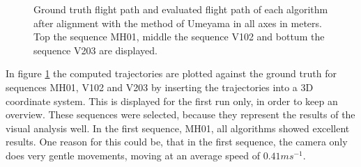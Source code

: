 	\begin{figure}%
    \centering
    \qquad
	\qquad
    \caption{
	Ground truth flight path and evaluated flight path of each algorithm after alignment with the method of Umeyama in all axes in meters. 
	Top the sequence MH01, middle the sequence V102 and bottum the sequence V203 are displayed.
	}%
    \label{fig:flight_path}%
	\end{figure}
	
	In figure \ref{fig:flight_path} the computed trajectories are plotted against the ground truth for sequences MH01, V102 and V203 by inserting the 
	trajectories into a 3D coordinate system. This is displayed for the first run only, in order to keep an overview. These sequences 
	were selected, because they represent the results of the visual analysis well. In the first sequence, MH01, all algorithms showed excellent results. 
	One reason for this could be, that in the first sequence, the camera only does very gentle movements, moving at an average speed of $0.41 ms^{-1}$. 
	
